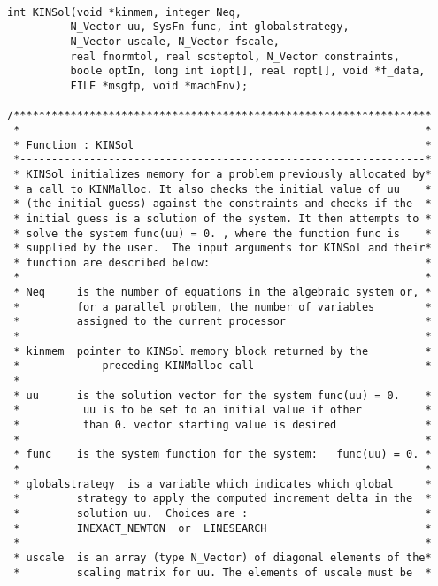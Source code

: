 \documentclass[11pt]{article}
\begin{document}
\small
\begin{verbatim}

int KINSol(void *kinmem, integer Neq, 
          N_Vector uu, SysFn func, int globalstrategy, 
          N_Vector uscale, N_Vector fscale,
          real fnormtol, real scsteptol, N_Vector constraints, 
          boole optIn, long int iopt[], real ropt[], void *f_data,
          FILE *msgfp, void *machEnv);

/******************************************************************
 *                                                                *
 * Function : KINSol                                              *
 *----------------------------------------------------------------*
 * KINSol initializes memory for a problem previously allocated by*
 * a call to KINMalloc. It also checks the initial value of uu    *
 * (the initial guess) against the constraints and checks if the  *
 * initial guess is a solution of the system. It then attempts to *
 * solve the system func(uu) = 0. , where the function func is    *
 * supplied by the user.  The input arguments for KINSol and their*
 * function are described below:                                  *
 *                                                                *
 * Neq     is the number of equations in the algebraic system or, *
 *         for a parallel problem, the number of variables        *
 *         assigned to the current processor                      *
 *                                                                *
 * kinmem  pointer to KINSol memory block returned by the         *
 *             preceding KINMalloc call                           *
 *                                            
 * uu      is the solution vector for the system func(uu) = 0.    *
 *          uu is to be set to an initial value if other          *
 *          than 0. vector starting value is desired              *
 *                                                                *
 * func    is the system function for the system:   func(uu) = 0. *          
 *                                                                *
 * globalstrategy  is a variable which indicates which global     *
 *         strategy to apply the computed increment delta in the  *
 *         solution uu.  Choices are :                            *
 *         INEXACT_NEWTON  or  LINESEARCH                         *
 *                                                                *
 * uscale  is an array (type N_Vector) of diagonal elements of the*
 *         scaling matrix for uu. The elements of uscale must be  *

\end{verbatim}
\end{document}
